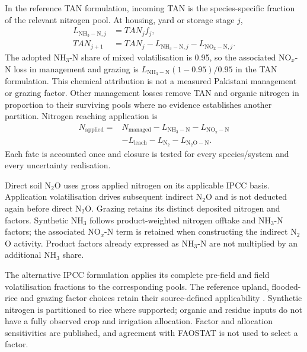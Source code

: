 \documentclass[essd]{copernicus}
\begin{document}
In the reference TAN formulation, incoming TAN is the species-specific fraction of the relevant nitrogen pool. At housing, yard or storage stage $j$,
\begin{equation}
 \begin{aligned}
 L_{\mathrm{NH_3-N},j}&=TAN_j f_j,\\
 TAN_{j+1}&=TAN_j-L_{\mathrm{NH_3-N},j}-L_{\mathrm{NO_x-N},j}.
 \end{aligned}
 \label{eq:tan}
\end{equation}
The adopted NH$_3$-N share of mixed volatilisation is 0.95, so the associated NO$_x$-N loss in management and grazing is $L_{\mathrm{NH_3-N}}(1-0.95)/0.95$ in the TAN formulation. This chemical attribution is not a measured Pakistani management or grazing factor. Other management losses remove TAN and organic nitrogen in proportion to their surviving pools where no evidence establishes another partition. Nitrogen reaching application is
\begin{equation}
 \begin{aligned}
 N_{\mathrm{applied}}={}&N_{\mathrm{managed}}-L_{\mathrm{NH_3-N}}-L_{\mathrm{NO_x-N}}\\
 &-L_{\mathrm{leach}}-L_{\mathrm{N_2}}-L_{\mathrm{N_2O-N}}.
 \end{aligned}
 \label{eq:fon}
\end{equation}
Each fate is accounted once and closure is tested for every species/system and every uncertainty realisation.

Direct soil N$_2$O uses gross applied nitrogen on its applicable IPCC basis. Application volatilisation drives subsequent indirect N$_2$O and is not deducted again before direct N$_2$O. Grazing retains its distinct deposited nitrogen and factors. Synthetic NH$_3$ follows product-weighted nitrogen offtake and NH$_3$-N factors; the associated NO$_x$-N term is retained when constructing the indirect N$_2$O activity. Product factors already expressed as NH$_3$-N are not multiplied by an additional NH$_3$ share.

The alternative IPCC formulation applies its complete pre-field and field volatilisation fractions to the corresponding pools. The reference upland, flooded-rice and grazing factor choices retain their source-defined applicability \citep{IPCC2019}. Synthetic nitrogen is partitioned to rice where supported; organic and residue inputs do not have a fully observed crop and irrigation allocation. Factor and allocation sensitivities are published, and agreement with FAOSTAT \citep{FAOSTAT2025} is not used to select a factor.
\end{document}
